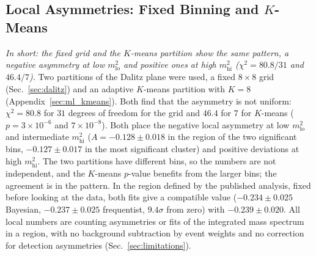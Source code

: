 \subsection{Local Asymmetries: Fixed Binning and $K$-Means}
\label{sec:comparison_local}
\emph{In short: the fixed grid and the $K$-means partition show the same pattern, a negative asymmetry at low $m^2_{\mathrm{lo}}$ and positive ones at high $m^2_{\mathrm{hi}}$ ($\chi^2=80.8/31$ and $46.4/7$).}
Two partitions of the Dalitz plane were used, a fixed $8\times8$ grid (Sec.~\ref{sec:dalitz}) and an adaptive $K$-means partition with $K=8$ (Appendix~\ref{sec:ml_kmeans}). Both find that the asymmetry is not uniform: $\chi^2=80.8$ for $31$ degrees of freedom for the grid and $46.4$ for $7$ for $K$-means ($p=3\times10^{-6}$ and $7\times10^{-8}$). Both place the negative local asymmetry at low $m^2_{\mathrm{lo}}$ and intermediate $m^2_{\mathrm{hi}}$ ($A=-0.128\pm0.018$ in the region of the two significant bins, $-0.127\pm0.017$ in the most significant cluster) and positive deviations at high $m^2_{\mathrm{hi}}$. The two partitions have different bins, so the numbers are not independent, and the $K$-means $p$-value benefits from the larger bins; the agreement is in the pattern. In the region defined by the published analysis, fixed before looking at the data, both fits give a compatible value ($-0.234\pm0.025$ Bayesian, $-0.237\pm0.025$ frequentist, $9.4\sigma$ from zero) with $-0.239\pm0.020$. All local numbers are counting asymmetries or fits of the integrated mass spectrum in a region, with no background subtraction by event weights and no correction for detection asymmetries (Sec.~\ref{sec:limitations}).
